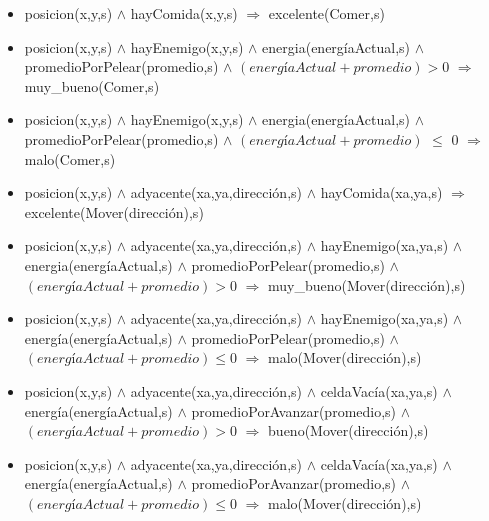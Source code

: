 \begin{itemize}

\item posicion(x,y,s) $\land$ hayComida(x,y,s) $\Rightarrow$ excelente(Comer,s)

\item posicion(x,y,s) $\land$ hayEnemigo(x,y,s) $\land$ energia(energíaActual,s)
$\land$ promedioPorPelear(promedio,s) $\land$ $(energíaActual + promedio) > 0$
$\Rightarrow$ \linebreak muy\_bueno(Comer,s)

\item posicion(x,y,s) $\land$ hayEnemigo(x,y,s) $\land$ energia(energíaActual,s)
$\land$ promedioPorPelear(promedio,s) $\land$ $(energíaActual + promedio)$ $\le$ 0
$\Rightarrow$ malo(Comer,s)

\item posicion(x,y,s) $\land$ adyacente(xa,ya,dirección,s) $\land$
hayComida(xa,ya,s) $\Rightarrow$ excelente(Mover(dirección),s)

\item posicion(x,y,s) $\land$ adyacente(xa,ya,dirección,s) $\land$
hayEnemigo(xa,ya,s) $\land$ energia(energíaActual,s) $\land$
promedioPorPelear(promedio,s) $\land$ $(energíaActual + promedio) > 0$ $\Rightarrow$
muy\_bueno(Mover(dirección),s)

\item posicion(x,y,s) $\land$ adyacente(xa,ya,dirección,s) $\land$
hayEnemigo(xa,ya,s) $\land$ energía(energíaActual,s) $\land$
promedioPorPelear(promedio,s) $\land$ $(energíaActual + promedio) \le 0$
$\Rightarrow$ malo(Mover(dirección),s)

\item posicion(x,y,s) $\land$ adyacente(xa,ya,dirección,s) $\land$
celdaVacía(xa,ya,s) $\land$ energía(energíaActual,s) $\land$
promedioPorAvanzar(promedio,s) $\land$ $(energíaActual + promedio) > 0$ $\Rightarrow$
bueno(Mover(dirección),s)

\item posicion(x,y,s) $\land$ adyacente(xa,ya,dirección,s) $\land$
celdaVacía(xa,ya,s) $\land$ energía(energíaActual,s) $\land$
promedioPorAvanzar(promedio,s) $\land$ $(energíaActual + promedio) \le 0$
$\Rightarrow$ malo(Mover(dirección),s)


\end{itemize}

